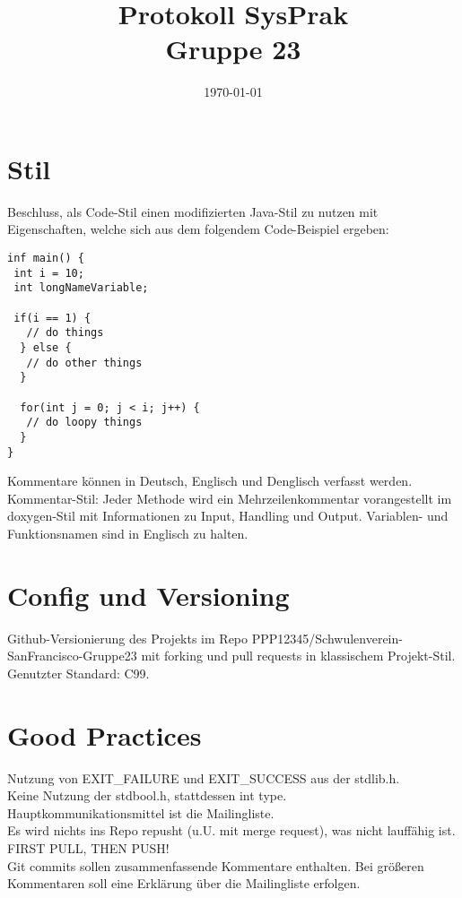 \documentclass[11pt]{article}
\title{\textbf{Protokoll SysPrak\\Gruppe 23}}
\author{}
\date{\today}
\begin{document}
\maketitle

\section*{Stil}
Beschluss, als Code-Stil einen modifizierten Java-Stil zu nutzen mit Eigenschaften, welche sich aus dem folgendem Code-Beispiel ergeben:
\begin{verbatim}
inf main() {
 int i = 10;
 int longNameVariable;
 
 if(i == 1) {
   // do things
  } else {
   // do other things
  }
  
  for(int j = 0; j < i; j++) {
   // do loopy things
  }
}
\end{verbatim}
Kommentare können in Deutsch, Englisch und Denglisch verfasst werden.\\
Kommentar-Stil: Jeder Methode wird ein Mehrzeilenkommentar vorangestellt im doxygen-Stil mit Informationen zu Input, Handling und Output.
Variablen- und Funktionsnamen sind in Englisch zu halten.\\
\section*{Config und Versioning}
Github-Versionierung des Projekts im Repo PPP12345/Schwulenverein-SanFrancisco-Gruppe23 mit forking und pull requests in klassischem Projekt-Stil.\\
Genutzter Standard: C99.\\
\section*{Good Practices}
Nutzung von EXIT\_FAILURE und EXIT\_SUCCESS aus der stdlib.h.\\
Keine Nutzung der stdbool.h, stattdessen int type.\\
Hauptkommunikationsmittel ist die Mailingliste.\\
Es wird nichts ins Repo repusht (u.U. mit merge request), was nicht lauffähig ist.\\
FIRST PULL, THEN PUSH!\\
Git commits sollen zusammenfassende Kommentare enthalten. Bei größeren Kommentaren soll eine Erklärung über die Mailingliste erfolgen.
\end{document}
